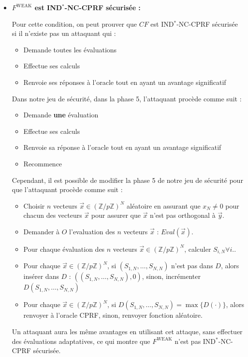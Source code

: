 \documentclass[9pt]{extarticle}
\begin{document}
\begin{itemize}
Dans notre implémentation de $F^{\text{WEAK}}$, nous utilisons le lazy sampling pour implémenter la fonction de hachage $H$. Ceci implique que $Eval_H(\vec{x}) = H(S \cdot \vec{x})$ est fixé uniquement lorsque l'évaluation de $\vec{x}$ est demandée, mais pas plus tôt.

On peut donc conclure que $P$ est non-programmable.

\item \textbf{$F^{\text{WEAK}}$ est IND$^*$-NC-CPRF sécurisée :}

Pour cette condition, on peut prouver que $CF$ est IND$^*$-NC-CPRF sécurisée si il n'existe pas un attaquant qui :

\begin{itemize}
  \item Demande toutes les évaluations
  \item Effectue ses calculs
  \item Renvoie ses réponses à l'oracle tout en ayant un avantage significatif
\end{itemize}

Dans notre jeu de sécurité, dans la phase 5, l'attaquant procède comme suit : 

\begin{itemize}
  \item Demande \textbf{une} évaluation
  \item Effectue ses calculs
  \item Renvoie sa réponse à l'oracle tout en ayant un avantage significatif
  \item Recommence
\end{itemize}

Cependant, il est possible de modifier la phase 5 de notre jeu de sécurité pour que l'attaquant procède comme suit : 

\begin{itemize}
  \item Choisir $n$ vecteurs $\vec{x} \in (\mathbb{Z}/p\mathbb{Z})^N$ aléatoire en assurant que $x_N \neq 0$ pour chacun des vecteurs $\vec{x}$ pour assurer que $\vec{x}$ n'est pas orthogonal à $\vec{y}$.
  \item Demander à $O$ l'evaluation des $n$ vecteurs $\vec{x}$ : $Eval(\vec{x})$.
  \item Pour chaque évaluation des $n$ vecteurs $\vec{x} \in (\mathbb{Z}/p\mathbb{Z})^N$, calculer $S_{i,N} \forall i$..
  \item Pour chaque $\vec{x} \in (\mathbb{Z}/p\mathbb{Z})^N$, si $(S_{1,N},\ldots,S_{N,N})$ n'est pas dans $D$, alors insérer dans $D$ : $( (S_{1,N},\ldots,S_{N,N}), 0)$, sinon, incrémenter $D(S_{1,N},\ldots,S_{N,N})$
  \item Pour chaque $\vec{x} \in (\mathbb{Z}/p\mathbb{Z})^N$, si $D(S_{1,N},\ldots,S_{N,N}) = \max\{D(\cdot)\}$, alors renvoyer à l'oracle CPRF, sinon, renvoyer fonction aléatoire.
\end{itemize}

Un attaquant aura les même avantages en utilisant cet attaque, sans effectuer des évaluations adaptatives, ce qui montre que $F^{\text{WEAK}}$ n'est pas IND$^*$-NC-CPRF sécurisée.

\end{itemize}
\end{document}
